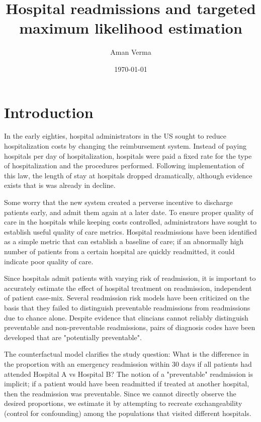 \documentclass[]{article}\usepackage[]{graphicx}\usepackage[]{color}
\begin{document}
\title{Hospital readmissions and targeted maximum likelihood estimation}
\author{Aman Verma}
\date{\today}


\section{Introduction}
In the early eighties, hospital administrators in the US sought to reduce hospitalization costs by changing the reimbursement system. Instead of paying hospitals per day of hospitalization, hospitals were paid a fixed rate for the type of hospitalization and the procedures performed. Following implementation of this law, the length of stay at hospitals dropped dramatically, although evidence exists that is was already in decline. 

Some worry that the new system created a perverse incentive to discharge patients early, and admit them again at a later date. To ensure proper quality of care in the hospitals while keeping costs controlled, administrators have sought to establish useful quality of care metrics. Hospital readmissions have been identified as a simple metric that can establish a baseline of care; if an abnormally high number of patients from a certain hospital are quickly readmitted, it could indicate poor quality of care. 

Since hospitals admit patients with varying risk of readmission, it is important to accurately estimate the effect of hospital treatment on readmission, independent of patient case-mix.  Several readmission risk models have been criticized on the basis that they failed to distinguish preventable readmissions from readmissions due to chance alone. Despite evidence that clincians cannot reliably distinguish preventable and non-preventable readmissions, pairs of diagnosis codes have been developed that are "potentially preventable". 

The counterfactual model clarifies the study question: What is the difference in the proportion with an emergency readmission within 30 days if all patients had attended Hospital A vs Hospital B? The notion of a "preventable" readmission is implicit; if a patient would have been readmitted if treated at another hospital, then the readmission was preventable. Since we cannot directly observe the desired proportions, we estimate it by attempting to recreate exchangeability (control for confounding) among the populations that visited different hospitals.
\end{document}
